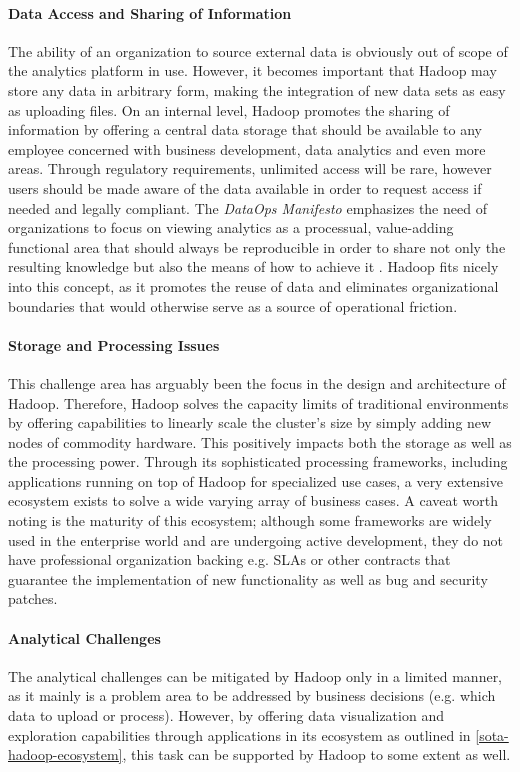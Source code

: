 \paragraph{Data Access and Sharing of Information}
The ability of an organization to source external data is obviously out of scope of the analytics platform in use. However, it becomes important that Hadoop may store any data in arbitrary form, making the integration of new data sets as easy as uploading files. On an internal level, Hadoop promotes the sharing of information by offering a central data storage that should be available to any employee concerned with business development, data analytics and even more areas. Through regulatory requirements, unlimited access will be rare, however users should be made aware of the data available in order to request access if needed and legally compliant. The \emph{DataOps Manifesto} emphasizes the need of organizations to focus on viewing analytics as a processual, value-adding functional area that should always be reproducible in order to share not only the resulting knowledge but also the means of how to achieve it \autocite[§11, §14, §17]{dataopsmanifesto}. Hadoop fits nicely into this concept, as it promotes the reuse of data and eliminates organizational boundaries that would otherwise serve as a source of operational friction.

\paragraph{Storage and Processing Issues}
This challenge area has arguably been the focus in the design and architecture of Hadoop. Therefore, Hadoop solves the capacity limits of traditional environments by offering capabilities to linearly scale the cluster's size by simply adding new nodes of commodity hardware. This positively impacts both the storage as well as the processing power. Through its sophisticated processing frameworks, including applications running on top of Hadoop for specialized use cases, a very extensive ecosystem exists to solve a wide varying array of business cases. A caveat worth noting is the maturity of this ecosystem; although some frameworks are widely used in the enterprise world and are undergoing active development, they do not have professional organization backing e.g. \acp{SLA} or other contracts that guarantee the implementation of new functionality as well as bug and security patches.

\paragraph{Analytical Challenges}
The analytical challenges can be mitigated by Hadoop only in a limited manner, as it mainly is a problem area to be addressed by business decisions (e.g. which data to upload or process). However, by offering data visualization and exploration capabilities through applications in its ecosystem as outlined in \autoref{sota-hadoop-ecosystem}, this task can be supported by Hadoop to some extent as well.

